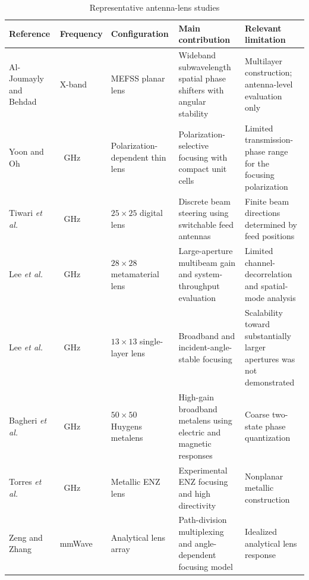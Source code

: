 \begin{table}[t]
\centering
\caption{Representative antenna-lens studies}
\label{tab:existing_lens_studies}
\footnotesize
\renewcommand{\arraystretch}{1.15}
\begin{tabularx}{\textwidth}
{
>{\raggedright\arraybackslash}p{2.4cm}
>{\centering\arraybackslash}p{1.6cm}
>{\raggedright\arraybackslash}p{2.1cm}
>{\raggedright\arraybackslash}X
>{\raggedright\arraybackslash}X
}
\toprule
Reference &
Frequency &
Configuration &
Main contribution &
Relevant limitation \\
\midrule

Al-Joumayly and Behdad \cite{Al-Joumayly2011} &
X-band &
MEFSS planar lens &
Wideband subwavelength spatial phase shifters with angular stability &
Multilayer construction; antenna-level evaluation only \\

Yoon and Oh \cite{Yoon2019} &
28~GHz &
Polarization-dependent thin lens &
Polarization-selective focusing with compact unit cells &
Limited transmission-phase range for the focusing polarization \\

Tiwari \textit{et al.} \cite{Tiwari2023} &
28~GHz &
$25\times25$ digital lens &
Discrete beam steering using switchable feed antennas &
Finite beam directions determined by feed positions \\

Lee \textit{et al.} \cite{Lee2022Large} &
28~GHz &
$28\times28$ metamaterial lens &
Large-aperture multibeam gain and system-throughput evaluation &
Limited channel-decorrelation and spatial-mode analysis \\

Lee \textit{et al.} \cite{Lee2021} &
38~GHz &
$13\times13$ single-layer lens &
Broadband and incident-angle-stable focusing &
Scalability toward substantially larger apertures was not demonstrated \\

Bagheri \textit{et al.} \cite{Bagheri2023} &
69~GHz &
$50\times50$ Huygens metalens &
High-gain broadband metalens using electric and magnetic responses &
Coarse two-state phase quantization \\

Torres \textit{et al.} \cite{Torres2015} &
144~GHz &
Metallic ENZ lens &
Experimental ENZ focusing and high directivity &
Nonplanar metallic construction \\

Zeng and Zhang \cite{Zeng2016} &
mmWave &
Analytical lens array &
Path-division multiplexing and angle-dependent focusing model &
Idealized analytical lens response \\


\end{tabularx}
\end{table}
